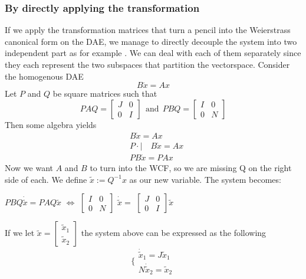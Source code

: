 \subsubsection{By directly applying the transformation}
If we apply the transformation matrices that turn a pencil into the Weierstrass canonical form on the DAE, we manage to directly decouple the system into two independent part as for example \cite{janheiland}. We can deal with each of them separately since they each represent the two subspaces that partition the vectorspace.
Consider the homogenous DAE 
\begin{equation}
 B\dot{x}= Ax \label{eq:dae}
\end{equation}
Let \(P\) and \(Q\) be square matrices such that
\[ PAQ =
    \begin{bmatrix}
        J & 0 \\ 
        0 & I
    \end{bmatrix} \ \ \text{and} \ \
    PBQ =
    \begin{bmatrix}
        I & 0 \\ 
        0 & N
    \end{bmatrix}
\]
Then some algebra yields 
\begin{align*}
    &B\dot{x}= Ax \\
    &P\cdot| \quad B\dot{x}= Ax \\
    & PB \dot x = PAx
\end{align*}
Now we want $A$ and $B$ to turn into the WCF, so we are missing Q on the right side of each. We define ${\tilde{x}} := Q^{-1}x$ as our new variable. The system becomes: 
\begin{center}
    $PBQ\dot{\tilde{x}} = PAQ\tilde{x}$
    \(\iff\) 
    \(\begin{bmatrix}
        I & 0 \\ 0 & N
    \end{bmatrix} \) \(\dot{\tilde{x}} = \) \(\begin{bmatrix}
        J & 0 \\ 0 & I
    \end{bmatrix} \)\(\tilde{x}\)
\end{center}

If we let \( {\tilde x} = 
\begin{bmatrix}
    \tilde x_1 \\
    \tilde x_2
\end{bmatrix}
\)
the system above can be expressed as the following
\[ \Bigg\{ \begin{matrix}
     \dot{\tilde x} _1= J \tilde x_1 \\
     N \dot{\tilde x}_2 = \tilde x_2
\end{matrix}  \]

